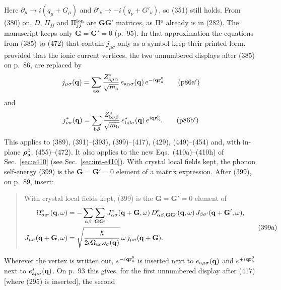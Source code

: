 \documentclass[11pt]{article}
\begin{document}
Here $\partial_\mu\to i(q_\mu+G_\mu)$ and $\partial'_\nu\to-i(q_\nu+G'_\nu)$, so (351) still holds. From
(380) on, $D$, $\Pi_{jj}$ and $\Pi^{\rm ion}_{jj}$ are $\mathbf G\mathbf G'$ matrices, as $\Pi^{\rm e}$ already is
in (282). The manuscript keeps only $\mathbf G=\mathbf G'=0$ (p.~95). In that approximation the equations
from (385) to (472) that contain $j_{\mu\sigma}$ only as a symbol keep their printed form, provided that
the ionic current vertices, the two unnumbered displays after (385) on p.~86, are replaced by
\begin{equation*}
j_{\mu\sigma}(\mathbf q)=\sum_{{\rm a}\alpha}\frac{Z^*_{{\rm a}\mu\alpha}}{\sqrt{m_{\rm a}}}\,
e_{{\rm a}\alpha\sigma}(\mathbf q)\,e^{-i\mathbf q\mathbf r^0_{\rm a}}\tag{p86a$'$}
\end{equation*}
and
\begin{equation*}
j^*_{\nu\sigma}(\mathbf q)=\sum_{{\rm b}\beta}\frac{Z^*_{{\rm b}\nu\beta}}{\sqrt{m_{\rm b}}}\,
e^*_{{\rm b}\beta\sigma}(\mathbf q)\,e^{i\mathbf q\mathbf r^0_{\rm b}}.\tag{p86b$'$}
\end{equation*}
This applies to (389), (391)--(393), (399)--(417), (429), (449)--(454) and, with in-plane
$\bm{\rho}^0_{\rm a}$, (455)--(472). It also applies to the new Eqs.~(410a)--(410h) of
Sec.~\ref{sec:e410} (see Sec.~\ref{sec:int-e410}). With crystal local fields kept, the phonon
self-energy (399) is the $\mathbf G=\mathbf G'=0$ element of a matrix expression. After (399), on p.~89,
insert:
\begin{quote}
With crystal local fields kept, (399) is the $\mathbf G=\mathbf G'=0$ element of
\begin{equation*}
\begin{aligned}
\Omega^{\rm e}_{\sigma\sigma'}(\mathbf q,\omega)&=-\sum_{\alpha\beta}\sum_{\mathbf G\mathbf G'}
J^*_{\alpha\sigma}(\mathbf q+\mathbf G,\omega)\,D^{\rm e}_{\alpha\beta,\mathbf G\mathbf G'}(\mathbf q,\omega)\,
J_{\beta\sigma'}(\mathbf q+\mathbf G',\omega),\\
J_{\mu\sigma}(\mathbf q+\mathbf G,\omega)&=\sqrt{\frac{\hbar}{2c\Omega_{\rm uc}\omega_\sigma(\mathbf q)}}\,
\omega\,j_{\mu\sigma}(\mathbf q+\mathbf G).
\end{aligned}
\tag{399a}
\end{equation*}
\end{quote}
Wherever the vertex is written out, $e^{-i\mathbf q\mathbf r^0_{\rm a}}$ is inserted next to
$e_{{\rm a}\mu\sigma}(\mathbf q)$ and $e^{+i\mathbf q\mathbf r^0_{\rm a}}$ next to $e^*_{{\rm a}\mu\sigma}(\mathbf q)$.
On p.~93 this gives, for the first unnumbered display after (417) [where (295) is inserted], the second
\end{document}
